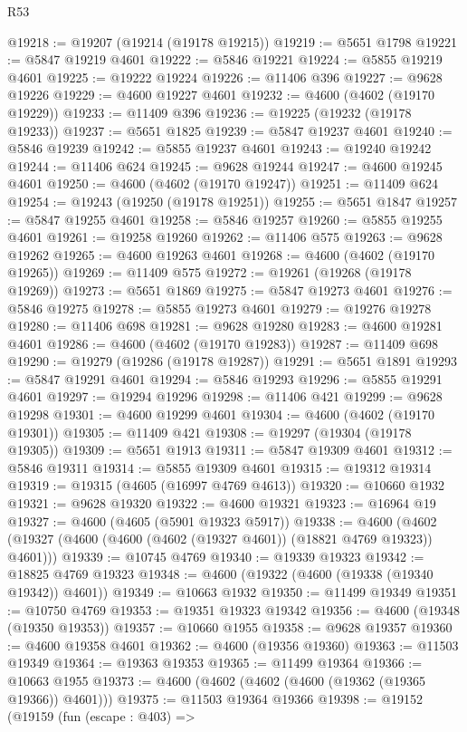 \begin{lexlean}{R53}
\begin{coremodule}
@19218 := @19207 (@19214 (@19178 @19215))
@19219 := @5651 @1798
@19221 := @5847 @19219 @4601
@19222 := @5846 @19221
@19224 := @5855 @19219 @4601
@19225 := @19222 @19224
@19226 := @11406 @396
@19227 := @9628 @19226
@19229 := @4600 @19227 @4601
@19232 := @4600 (@4602 (@19170 @19229))
@19233 := @11409 @396
@19236 := @19225 (@19232 (@19178 @19233))
@19237 := @5651 @1825
@19239 := @5847 @19237 @4601
@19240 := @5846 @19239
@19242 := @5855 @19237 @4601
@19243 := @19240 @19242
@19244 := @11406 @624
@19245 := @9628 @19244
@19247 := @4600 @19245 @4601
@19250 := @4600 (@4602 (@19170 @19247))
@19251 := @11409 @624
@19254 := @19243 (@19250 (@19178 @19251))
@19255 := @5651 @1847
@19257 := @5847 @19255 @4601
@19258 := @5846 @19257
@19260 := @5855 @19255 @4601
@19261 := @19258 @19260
@19262 := @11406 @575
@19263 := @9628 @19262
@19265 := @4600 @19263 @4601
@19268 := @4600 (@4602 (@19170 @19265))
@19269 := @11409 @575
@19272 := @19261 (@19268 (@19178 @19269))
@19273 := @5651 @1869
@19275 := @5847 @19273 @4601
@19276 := @5846 @19275
@19278 := @5855 @19273 @4601
@19279 := @19276 @19278
@19280 := @11406 @698
@19281 := @9628 @19280
@19283 := @4600 @19281 @4601
@19286 := @4600 (@4602 (@19170 @19283))
@19287 := @11409 @698
@19290 := @19279 (@19286 (@19178 @19287))
@19291 := @5651 @1891
@19293 := @5847 @19291 @4601
@19294 := @5846 @19293
@19296 := @5855 @19291 @4601
@19297 := @19294 @19296
@19298 := @11406 @421
@19299 := @9628 @19298
@19301 := @4600 @19299 @4601
@19304 := @4600 (@4602 (@19170 @19301))
@19305 := @11409 @421
@19308 := @19297 (@19304 (@19178 @19305))
@19309 := @5651 @1913
@19311 := @5847 @19309 @4601
@19312 := @5846 @19311
@19314 := @5855 @19309 @4601
@19315 := @19312 @19314
@19319 := @19315 (@4605 (@16997 @4769 @4613))
@19320 := @10660 @1932
@19321 := @9628 @19320
@19322 := @4600 @19321
@19323 := @16964 @19
@19327 := @4600 (@4605 (@5901 @19323 @5917))
@19338 := @4600 (@4602 (@19327 (@4600 (@4600 (@4602 (@19327 @4601)) (@18821 @4769 @19323)) @4601)))
@19339 := @10745 @4769
@19340 := @19339 @19323
@19342 := @18825 @4769 @19323
@19348 := @4600 (@19322 (@4600 (@19338 (@19340 @19342)) @4601))
@19349 := @10663 @1932
@19350 := @11499 @19349
@19351 := @10750 @4769
@19353 := @19351 @19323 @19342
@19356 := @4600 (@19348 (@19350 @19353))
@19357 := @10660 @1955
@19358 := @9628 @19357
@19360 := @4600 @19358 @4601
@19362 := @4600 (@19356 @19360)
@19363 := @11503 @19349
@19364 := @19363 @19353
@19365 := @11499 @19364
@19366 := @10663 @1955
@19373 := @4600 (@4602 (@4602 (@4600 (@19362 (@19365 @19366)) @4601)))
@19375 := @11503 @19364 @19366
@19398 := @19152
    (@19159
      (fun (escape : @403) =>

\end{coremodule}
\end{lexlean}
